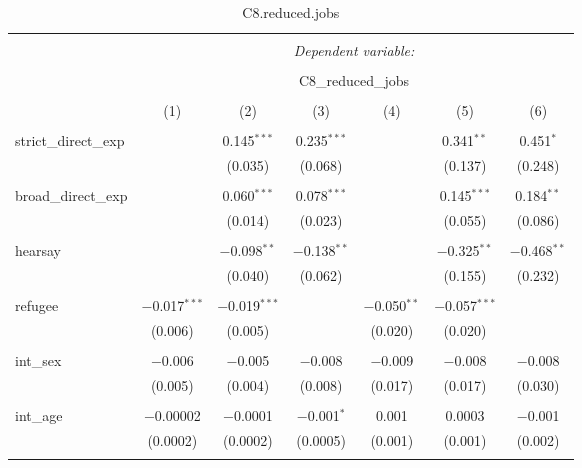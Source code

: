 
\begin{table}[H] \centering 
  \caption{C8.reduced.jobs} 
  \label{} 
\tiny 
\begin{tabular}{@{\extracolsep{4pt}}lcccccc} 
\\[-1.8ex]\hline 
\hline \\[-1.8ex] 
 & \multicolumn{6}{c}{\textit{Dependent variable:}} \\ 
\cline{2-7} 
\\[-1.8ex] & \multicolumn{6}{c}{C8\_reduced\_jobs} \\ 
\\[-1.8ex] & (1) & (2) & (3) & (4) & (5) & (6)\\ 
\hline \\[-1.8ex] 
 strict\_direct\_exp &  & 0.145$^{***}$ & 0.235$^{***}$ &  & 0.341$^{**}$ & 0.451$^{*}$ \\ 
  &  & (0.035) & (0.068) &  & (0.137) & (0.248) \\ 
  & & & & & & \\ 
 broad\_direct\_exp &  & 0.060$^{***}$ & 0.078$^{***}$ &  & 0.145$^{***}$ & 0.184$^{**}$ \\ 
  &  & (0.014) & (0.023) &  & (0.055) & (0.086) \\ 
  & & & & & & \\ 
 hearsay &  & $-$0.098$^{**}$ & $-$0.138$^{**}$ &  & $-$0.325$^{**}$ & $-$0.468$^{**}$ \\ 
  &  & (0.040) & (0.062) &  & (0.155) & (0.232) \\ 
  & & & & & & \\ 
 refugee & $-$0.017$^{***}$ & $-$0.019$^{***}$ &  & $-$0.050$^{**}$ & $-$0.057$^{***}$ &  \\ 
  & (0.006) & (0.005) &  & (0.020) & (0.020) &  \\ 
  & & & & & & \\ 
 int\_sex & $-$0.006 & $-$0.005 & $-$0.008 & $-$0.009 & $-$0.008 & $-$0.008 \\ 
  & (0.005) & (0.004) & (0.008) & (0.017) & (0.017) & (0.030) \\ 
  & & & & & & \\ 
 int\_age & $-$0.00002 & $-$0.0001 & $-$0.001$^{*}$ & 0.001 & 0.0003 & $-$0.001 \\ 
  & (0.0002) & (0.0002) & (0.0005) & (0.001) & (0.001) & (0.002) \\ 
  & & & & & & \\ 

\end{tabular}
\end{table}
